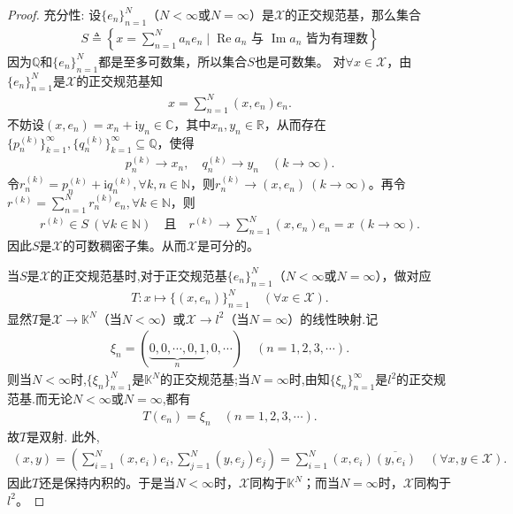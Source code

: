 \documentclass[../../main.tex]{subfiles}%
\begin{document}
\begin{proof}
{\heiti 充分性:} 设$\{e_n\}_{n=1}^{N}$（$N < \infty$或$N = \infty$）是$\mathscr{X}$的正交规范基，那么集合
\begin{align*}
S\triangleq \left\{x = \sum\limits_{n=1}^{N} a_n e_n \mid \operatorname{Re}a_n \text{ 与 } \operatorname{Im}a_n \text{ 皆为有理数}\right\}
\end{align*}
因为$\mathbb{Q}$和$\{ e_n \}_{n=1}^{N}$都是至多可数集，所以集合$S$也是可数集。
对$\forall x\in \mathscr{X}$，由$\{ e_n \}_{n=1}^{N}$是$\mathscr{X}$的正交规范基知
\begin{align*}
x=\sum\limits_{n=1}^N (x,e_n) e_n.
\end{align*}
不妨设$(x,e_n)=x_n+\mathrm{i}y_n\in \mathbb{C}$，其中$x_n,y_n\in \mathbb{R}$，从而存在$\{ p_{n}^{(k)} \}_{k=1}^{\infty},\{ q_{n}^{(k)} \}_{k=1}^{\infty}\subseteq \mathbb{Q}$，使得
\begin{align*}
p_{n}^{(k)}\rightarrow x_n,\quad q_{n}^{(k)}\rightarrow y_n \quad (k\rightarrow \infty).
\end{align*}
令$r_{n}^{(k)}=p_{n}^{(k)}+\mathrm{i}q_{n}^{(k)},\forall k,n\in \mathbb{N}$，则$r_{n}^{(k)}\rightarrow (x,e_n) \ (k\rightarrow \infty)$。再令$r^{(k)}=\sum\limits_{n=1}^N r_{n}^{(k)} e_n,\forall k\in \mathbb{N}$，则
\begin{align*}
r^{(k)}\in S \ (\forall k\in \mathbb{N}) \quad \text{且} \quad r^{(k)}\rightarrow \sum\limits_{n=1}^N (x,e_n) e_n=x \ (k\rightarrow \infty).
\end{align*}
因此$S$是$\mathscr{X}$的可数稠密子集。从而$\mathscr{X}$是可分的。

当$S$是$\mathscr{X}$的正交规范基时,对于正交规范基$\{e_n\}_{n=1}^{N}$（$N < \infty$或$N = \infty$），做对应
\begin{align*}
T: x \mapsto \{(x, e_n)\}_{n=1}^{N} \quad (\forall x \in \mathscr{X}).
\end{align*}
显然$T$是$\mathscr{X} \to \mathbb{K}^N$（当$N < \infty$）或$\mathscr{X} \to l^2$（当$N = \infty$）的线性映射.记
\begin{align*}
\xi_n = (\underbrace{0, 0, \cdots, 0, 1}_{n}, 0, \cdots) \quad (n=1,2,3,\cdots).
\end{align*}
则当$N<\infty$时,$\{\xi_n\}_{n=1}^{N}$是$\mathbb{K}^N$的正交规范基;当$N=\infty$时,由知$\{\xi_n\}_{n=1}^{\infty}$是$l^2$的正交规范基.而无论$N<\infty$或$N=\infty$,都有
\begin{align*}
T(e_n) = \xi_n\quad (n=1,2,3,\cdots).
\end{align*}
故$T$是双射.
此外,
\begin{align*}
(x, y) = \left( \sum\limits_{i=1}^{N} (x, e_i) e_i, \sum\limits_{j=1}^{N} (y, e_j) e_j \right) 
= \sum\limits_{i=1}^{N} (x, e_i) \overline{(y, e_i)} \quad (\forall x, y \in \mathscr{X}).
\end{align*}
因此$T$还是保持内积的。于是当$N < \infty$时，$\mathscr{X}$同构于$\mathbb{K}^N$；而当$N = \infty$时，$\mathscr{X}$同构于$l^2$。

\end{proof}
\end{document}
